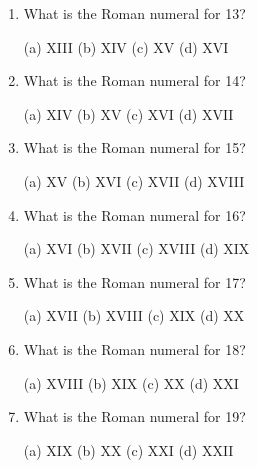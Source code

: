 \documentclass{article}
\begin{document}
\begin{enumerate}
(a) XII
(b) XIII
(c) XIV
(d) XV

\item What is the Roman numeral for 13?

(a) XIII
(b) XIV
(c) XV
(d) XVI

\item What is the Roman numeral for 14?

(a) XIV
(b) XV
(c) XVI
(d) XVII

\item What is the Roman numeral for 15?

(a) XV
(b) XVI
(c) XVII
(d) XVIII

\item What is the Roman numeral for 16?

(a) XVI
(b) XVII
(c) XVIII
(d) XIX

\item What is the Roman numeral for 17?

(a) XVII
(b) XVIII
(c) XIX
(d) XX

\item What is the Roman numeral for 18?

(a) XVIII
(b) XIX
(c) XX
(d) XXI

\item What is the Roman numeral for 19?

(a) XIX
(b) XX
(c) XXI
(d) XXII

\end{enumerate}
\end{document}
